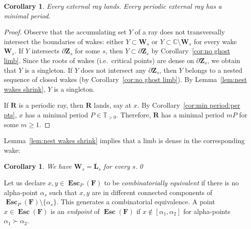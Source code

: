 \documentclass{amsart}
\newcommand{\1}{{\mathbb 1 }}
\newcommand\PT{\mathbb{ T}}
\newcommand{\bF}{{\mathbf F}}
\newcommand{\bZ}{{\mathbf Z}}
\newcommand{\bL}{{\mathbf L}}
\newcommand{\bW}{{\mathbf W}}
\newcommand{\bR}{{\mathbf R}}
\newcommand{\C}{\mathbb{C}}
\newtheorem{cor}[thm]{Corollary}
\theoremstyle{remark}
\numberwithin{equation}{section}
\theoremstyle{definition}
\newcommand{\Esc}{{\boldsymbol{\operatorname{Esc}}}}
\theoremstyle{nonumberbreak}
\begin{document}
\begin{cor}
\label{cor:ext rays land}
Every external ray lands.  Every periodic external ray has a minimal period.  
\end{cor}
\begin{proof}
Observe that the accumulating set $Y$ of a ray does not transversally intersect the boundaries of wakes: either $Y\subset \bW_s$ or $Y\subset \overline{\C\setminus \bW_s }$ for every wake $\bW_s$. If $Y$ intersects $\partial \bZ_s$ for some $s$, then $Y\subset \partial \bZ_s$ by Corollary~\ref{cor:no ghost limb}. Since the roots of wakes (i.e.~critical points) are dense on $\partial \bZ_s$, we obtain that $Y$ is a singleton. If $Y$ does not intersect any  $\partial \bZ_s$, then $Y$ belongs to a nested sequence of closed wakes (by Corollary~\ref{cor:no ghost limb}). By Lemma~\ref{lem:nest wakes shrink}, $Y$ is a singleton.  

If $\bR$ is a periodic ray, then $\bR$ lands, say at $x$. By Corollary~\ref{cor:min period:per pts}, $x$ has a minimal period $P\in \PT_{>0}$. Therefore, $\bR$ has a minimal period $m P$ for some $m\ge 1$.
 \end{proof}
 
 

Lemma~\ref{lem:nest wakes shrink} implies that a limb is dense in the corresponding wake:
\begin{cor}
\label{cor:wake:clos:limb}
We have $\bW_s=\overline \bL_s$ for every $s$.\qed
\end{cor}

 


Let us declare  $x,y\in \Esc_P(\bF)$ to be \emph{combinatorially equivalent} if there is no alpha-point $\alpha_s$ such that $x,y$ are in different connected components of $\Esc_P(\bF)\setminus \{\alpha_s\}$. This generates a combinatorial equivalence. A point $x\in  \Esc(\bF)$ is an \emph{endpoint} of $\Esc(\bF)$ if $x\not\in [\alpha_1,\alpha_2]$ for alpha-points $\alpha_1\succ \alpha_2$.
\end{document}
